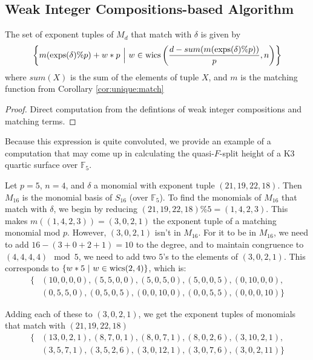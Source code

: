 \subsection{Weak Integer Compositions-based Algorithm}

\begin{lem}
    \label{lem:generate:matching}
    The set of exponent tuples of \(M_{d}\) that match with $\delta$ is given by 
    \[
        \left\{ m(\operatorname{exps}(\delta) \% p) + w *p ~\Big|~ w \in \operatorname{wics} \left(\frac{d - sum(m(\operatorname{exps}(\delta) \% p))}{p}, n \right) \right\}
    \]
    where $sum(X)$ is the sum of the elements of tuple $X$, and $m$ is the matching function from Corollary \ref{cor:unique:match}
\end{lem}

\begin{proof}
    Direct computation from the defintions of weak integer compositions and matching terms.
\end{proof}


Because this expression is quite convoluted, we 
provide an example of a computation 
that may come up in calculating the quasi-\(F\)-split 
height of a K3 quartic surface over $\mathbb{F}_5$.

\begin{ex}
    Let $p = 5$, \(n = 4\), and $\delta$ a monomial 
    with exponent tuple $(21, 19, 22, 18)$. 
    Then $M_{16}$ is the monomial basis of 
    \(S_{16}\) (over $\mathbb{F}_5$). 
    To find the monomials of $M_{16}$ that match with 
    $\delta$, we begin by reducing $(21, 19, 22, 18) \% 5 = (1, 4, 2, 3)$.
    This makes $m((1, 4, 2, 3)) = (3, 0, 2, 1)$ the 
    exponent tuple of a matching monomial mod \(p\).
    However, \((3, 0, 2, 1)\) isn't in $M_{16}$. 
    For it to be in $M_{16}$, we need to add $16 - (3 + 0 + 2 + 1) = 10$ 
    to the degree, and to maintain congruence to 
    $(4, 4, 4, 4) \mod 5$, we need to add two $5$'s 
    to the elements of $(3, 0, 2, 1)$. This corresponds 
    to $\{w * 5 ~|~ w \in \operatorname{wics}(2, 4)\}$, which is:
    \begin{align*}
        \{&(10, 0, 0, 0), (5, 5, 0, 0), (5, 0, 5, 0), (5, 0, 0, 5), (0, 10, 0, 0), \\
        &(0, 5, 5, 0), (0, 5, 0, 5), (0, 0, 10, 0), (0, 0, 5, 5), (0, 0, 0, 10)\}
    \end{align*}
        
    \noindent Adding each of these to $(3, 0, 2, 1)$, we get the 
    exponent tuples of monomials that match with $(21, 19, 22, 18)$
    \begin{align*}
        \{&(13, 0, 2, 1), (8, 7, 0, 1), (8, 0, 7, 1), (8, 0, 2, 6), (3, 10, 2, 1), \\
        &(3, 5, 7, 1), (3, 5, 2, 6), (3, 0, 12, 1), (3, 0, 7, 6), (3, 0, 2, 11)\}
    \end{align*}    
\end{ex}


